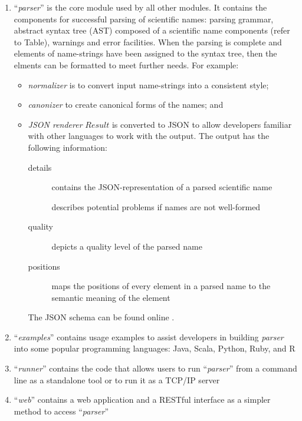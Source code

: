 \documentclass{bmcart}
\begin{document}
\begin{enumerate}

  \item ``\textit{parser}'' is the core module used by all other modules. It
    contains the components for successful parsing of scientific names: parsing
    grammar, abstract syntax tree (AST) composed of a scientific name
    components (refer to Table), warnings and error facilities.  When the
    parsing is complete and elements of name-strings have been assigned to the
    syntax tree, then the elments can be formatted to meet further needs.  For
    example:


\begin{itemize}

  \item \textit{normalizer} is to convert input name-strings into a consistent
    style;

  \item \textit{canonizer} to create canonical forms of the names; and

  \item \textit{JSON renderer}  $Result$ is converted to JSON
    \cite{bray2014javascript} to allow developers familiar with other languages
    to work with the output.  The output has the following information:

\begin{description}
  \item[details] contains the JSON-representation of a parsed scientific
    name

   describes potential problems if names are not
    well-formed

  \item[quality] depicts a quality level of the parsed name

  \item[positions] maps the positions of every element in a parsed name to
    the semantic meaning of the element
\end{description}

The JSON schema can be found online \cite{gnparser-json}.


\end{itemize}




  \item ``\textit{examples}'' contains usage examples to assist developers in building \textit{parser} into some popular programming languages: Java, Scala, Python, Ruby, and R
  \item ``\textit{runner}'' contains the code that allows users to run ``\textit{parser}''
  from a command line as a standalone tool or to run it as a TCP/IP server
  \item ``\textit{web}'' contains a web application and a RESTful interface as a simpler method to access ``\textit{parser}''
\end{enumerate}
\end{document}
